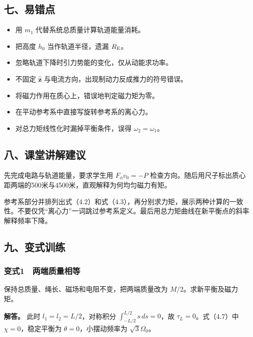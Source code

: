 \documentclass[12pt,a4paper,fontset=fandol]{ctexart}
\providecommand{\tightlist}{\setlength{\itemsep}{0pt}\setlength{\parskip}{0pt}}
\begin{document}
\subsection{七、易错点}\label{ux4e03ux6613ux9519ux70b9-3}

\begin{itemize}
\tightlist
\item
  用 \(m_1\) 代替系统总质量计算轨道能量消耗。
\item
  把高度 \(h_0\) 当作轨道半径，遗漏 \(R_{\rm E}\)。
\item
  忽略轨道下降时引力势能的变化，仅从动能求功率。
\item
  不固定 \(\hat{\boldsymbol z}\)
  与电流方向，出现制动力反成推力的符号错误。
\item
  将磁力作用在质心上，错误地判定磁力矩为零。
\item
  在平动参考系中直接写旋转参考系的离心力。
\item
  对总力矩线性化时漏掉平衡条件，误得 \(\omega_2=\omega_1\)。
\end{itemize}

\subsection{八、课堂讲解建议}\label{ux516bux8bfeux5802ux8bb2ux89e3ux5efaux8bae-3}

先完成电路与轨道能量，要求学生用 \(F_\phi v_0=-P\)
检查方向。随后用尺子标出质心距两端的500米与4500米，直观解释为何均匀磁力有矩。

参考系部分并排列出式（4.2）和式（4.3），再分别求力矩，展示两种计算的一致性。不要仅凭``离心力''一词跳过参考系定义。最后用总力矩曲线在新平衡点的斜率解释频率下降。

\subsection{九、变式训练}\label{ux4e5dux53d8ux5f0fux8badux7ec3-3}

\subsubsection{变式1　两端质量相等}\label{ux53d8ux5f0f1-ux4e24ux7aefux8d28ux91cfux76f8ux7b49}

保持总质量、绳长、磁场和电阻不变，把两端质量改为
\(M/2\)。求新平衡及磁力矩。

\textbf{解答。} 此时 \(l_1=l_2=L/2\)，对称积分
\(\int_{-L/2}^{L/2}s\,ds=0\)，故 \(\tau_L=0\)。式（4.7）中
\(\chi=0\)，稳定平衡为 \(\theta=0\)，小摆动频率为 \(\sqrt3\Omega_0\)。
\end{document}
